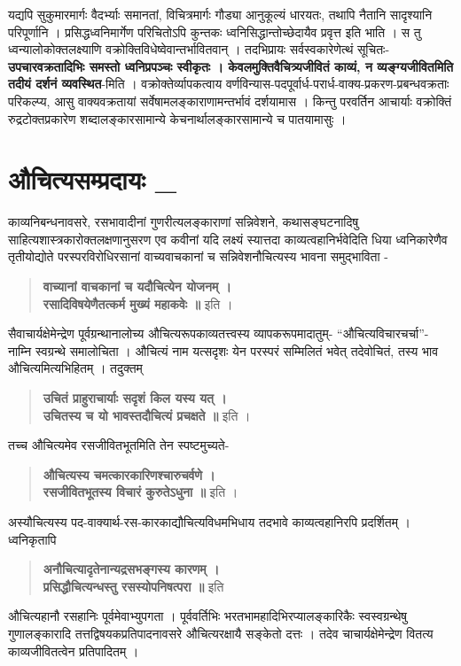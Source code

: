 यद्यपि सुकुमारमार्गः वैदर्भ्याः समानतां, विचित्रमार्गः गौड्या आनुकूल्यं धारयतः, तथापि नैतानि सादृश्यानि परिपूर्णानि । प्रसिद्धध्वनिमार्गेण परिचितोऽपि कुन्तकः ध्वनिसिद्धान्तोच्छेदायैव प्रवृत्त इति भाति । स तु ध्वन्यालोकोक्तलक्ष्याणि वक्रोक्तिविधेष्वेवान्तर्भावितवान् । तदभिप्रायः सर्वस्वकारेणेत्थं सूचितः- \textbf{उपचारवक्रतादिभिः समस्तो ध्वनिप्रपञ्चः स्वीकृतः । केवलमुक्तिवैचित्र्यजीवितं काव्यं, न व्यङ्ग्यजीवितमिति तदीयं दर्शनं व्यवस्थित}-मिति । वक्रोक्तेर्व्यापकत्वाय वर्णविन्यास-पदपूर्वार्ध-परार्ध-वाक्य-प्रकरण-प्रबन्धवक्रताः परिकल्प्य, आसु वाक्यवक्रतायां सर्वेषामलङ्काराणामन्तर्भावं दर्शयामास । किन्तु परवर्तिन आचार्याः वक्रोक्तिं रुद्रटोक्तप्रकारेण शब्दालङ्कारसामान्ये केचनार्थालङ्कारसामान्ये च पातयामासुः ।

\section*{ औचित्यसम्प्रदायः \_} 

काव्यनिबन्धनावसरे, रसभावादीनां गुणरीत्यलङ्काराणां सन्निवेशने, कथासङ्घटनादिषु साहित्यशास्त्रकारोक्तलक्षणानुसरण एव कवीनां यदि लक्ष्यं स्यात्तदा काव्यत्वहानिर्भवेदिति धिया ध्वनिकारेणैव तृतीयोद्योते परस्परविरोधिरसानां वाच्यवाचकानां च सन्निवेशनौचित्यस्य भावना समुद्भाविता - 
\begin{verse}
\textbf{वाच्यानां वाचकानां च यदौचित्येन योजनम् ।\\
रसादिविषयेणैतत्कर्म मुख्यं महाकवेः ॥} इति । 
\end{verse}
सैवाचार्यक्षेमेन्द्रेण पूर्वग्रन्थानालोच्य औचित्यरूपकाव्यतत्त्वस्य व्यापकरूपमादातुम्- “औचित्यविचारचर्चा”- नाम्नि स्वग्रन्थे समालोचिता । औचित्यं नाम यत्सदृशः येन परस्परं सम्मिलितं भवेत् तदेवोचितं, तस्य भाव औचित्यमित्यभिहितम् । तदुक्तम्
\begin{verse}
\textbf{उचितं प्राहुराचार्याः सदृशं किल यस्य यत् । \\
उचितस्य च यो भावस्तदौचित्यं प्रचक्षते ॥} इति ।
\end{verse} 
तच्च औचित्यमेव रसजीवितभूतमिति तेन स्पष्टमुच्यते-
\begin{verse}
\textbf{औचित्यस्य चमत्कारकारिणश्चारुचर्वणे ।\\
रसजीवितभूतस्य विचारं कुरुतेऽधुना ॥} इति । 
\end{verse}
अस्यौचित्यस्य पद-वाक्यार्थ-रस-कारकाद्यौचित्यविधमभिधाय तदभावे काव्यत्वहानिरपि प्रदर्शितम् । ध्वनिकृतापि
\begin{verse}
\textbf{अनौचित्यादृतेनान्यद्रसभङ्गस्य कारणम् ।\\
प्रसिद्धौचित्यन्धस्तु रसस्योपनिषत्परा ॥} इति 
\end{verse}
औचित्यहानौ रसहानिः पूर्वमेवाभ्युपगता । पूर्ववर्तिभिः भरतभामहादिभिरप्यालङ्कारिकैः स्वस्वग्रन्थेषु गुणालङ्कारादि तत्तद्विषयकप्रतिपादनावसरे औचित्यरक्षायै सङ्केतो दत्तः । तदेव चाचार्यक्षेमेन्द्रेण वितत्य काव्यजीवितत्वेन प्रतिपादितम् । 

